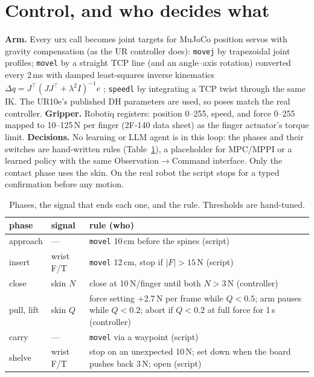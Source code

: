 \documentclass[10pt,twocolumn]{article}
\newcommand{\code}[1]{\texttt{\small #1}}
\begin{document}
\section{Control, and who decides what}
\textbf{Arm.} Every urx call becomes joint targets for MuJoCo position servos with gravity compensation (as the
UR controller does): \code{movej} by trapezoidal joint profiles; \code{movel} by a straight TCP line (and an
angle--axis rotation) converted every 2\,ms with damped least-squares inverse kinematics
$\Delta q=J^\top(JJ^\top+\lambda^2 I)^{-1}e$ \cite{wampler1986}; \code{speedl} by integrating a TCP twist through
the same IK. The UR10e's published DH parameters are used, so poses match the real controller.
\textbf{Gripper.} Robotiq registers: position 0--255, speed, and force 0--255 mapped to 10--125\,N per finger
(2F-140 data sheet) as the finger actuator's torque limit.
\textbf{Decisions.} No learning or LLM agent is in this loop: the phases and their switches are hand-written rules
(Table~\ref{tab:phases}), a placeholder for MPC/MPPI or a learned policy with the same
Observation$\to$Command interface. Only the contact phase uses the skin. On the real robot the script stops for a
typed confirmation before any motion.

\begin{table}[t]\centering\footnotesize
\setlength{\tabcolsep}{2.5pt}
\begin{tabularx}{\columnwidth}{@{}ll>{\raggedright\arraybackslash}X@{}}
\toprule
phase & signal & rule (who) \\
\midrule
approach & --- & \code{movel} 10\,cm before the spines (script) \\
insert & wrist F/T & \code{movel} 12\,cm, stop if $|F|>15$\,N (script) \\
close & skin $N$ & close at 10\,N/finger until both $N>3$\,N (controller) \\
pull, lift & skin $Q$ & force setting $+$2.7\,N per frame while $Q<0.5$; arm pauses while $Q<0.2$; abort if
$Q<0.2$ at full force for 1\,s (controller) \\
carry & --- & \code{movel} via a waypoint (script) \\
shelve & wrist F/T & stop on an unexpected 10\,N; set down when the board pushes back 3\,N; open (script) \\
\bottomrule
\end{tabularx}
\caption{Phases, the signal that ends each one, and the rule. Thresholds are hand-tuned.}
\label{tab:phases}
\end{table}
\end{document}
